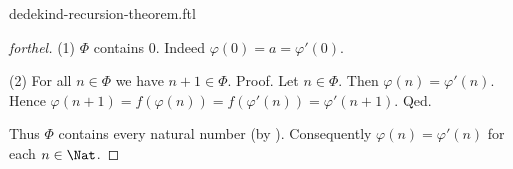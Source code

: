 \documentclass{naproche-library}
\begin{document}
\begin{smodule}{dedekind-recursion-theorem.ftl}
\begin{proof}[forthel]
    (1) $\Phi$ contains $0$.
    Indeed $\varphi(0) = a = \varphi'(0)$.

    (2) For all $n \in \Phi$ we have $n + 1 \in \Phi$. \newline
    Proof.
      Let $n \in \Phi$.
      Then $\varphi(n) = \varphi'(n)$.
      Hence $\varphi(n + 1)
        = f(\varphi(n))
        = f(\varphi'(n))
        = \varphi'(n + 1)$.
    Qed.

    Thus $\Phi$ contains every natural number (by ).
    Consequently $\varphi(n) = \varphi'(n)$ for each $n \in \Nat$.
  \end{proof}
\end{smodule}
\end{document}
